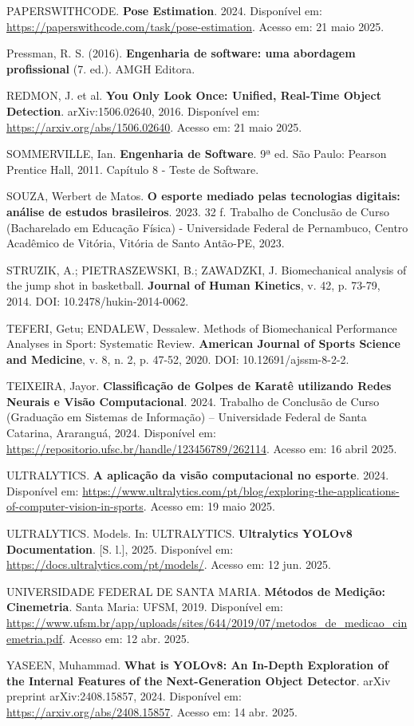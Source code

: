 \begin{flushleft}
PAPERSWITHCODE. \textbf{Pose Estimation}. 2024. Disponível em: \url{https://paperswithcode.com/task/pose-estimation}. Acesso em: 21 maio 2025.

Pressman, R. S. (2016). \textbf{Engenharia de software: uma abordagem profissional} (7. ed.). AMGH Editora.

REDMON, J. et al. \textbf{You Only Look Once: Unified, Real-Time Object Detection}. arXiv:1506.02640, 2016. Disponível em: \url{https://arxiv.org/abs/1506.02640}. Acesso em: 21 maio 2025.

SOMMERVILLE, Ian. \textbf{Engenharia de Software}. 9ª ed. São Paulo: Pearson Prentice Hall, 2011. Capítulo 8 - Teste de Software.

SOUZA, Werbert de Matos. \textbf{O esporte mediado pelas tecnologias digitais: análise de estudos brasileiros}. 2023. 32 f. Trabalho de Conclusão de Curso (Bacharelado em Educação Física) - Universidade Federal de Pernambuco, Centro Acadêmico de Vitória, Vitória de Santo Antão-PE, 2023.

STRUZIK, A.; PIETRASZEWSKI, B.; ZAWADZKI, J. Biomechanical analysis of the jump shot in basketball. \textbf{Journal of Human Kinetics}, v. 42, p. 73-79, 2014. DOI: 10.2478/hukin-2014-0062.

TEFERI, Getu; ENDALEW, Dessalew. Methods of Biomechanical Performance Analyses in Sport: Systematic Review. \textbf{American Journal of Sports Science and Medicine}, v. 8, n. 2, p. 47-52, 2020. DOI: 10.12691/ajssm-8-2-2.

TEIXEIRA, Jayor. \textbf{Classificação de Golpes de Karatê utilizando Redes Neurais e Visão Computacional}. 2024. Trabalho de Conclusão de Curso (Graduação em Sistemas de Informação) – Universidade Federal de Santa Catarina, Araranguá, 2024. Disponível em: \url{https://repositorio.ufsc.br/handle/123456789/262114}. Acesso em: 16 abril 2025.

ULTRALYTICS. \textbf{A aplicação da visão computacional no esporte}. 2024. Disponível em: \url{https://www.ultralytics.com/pt/blog/exploring-the-applications-of-computer-vision-in-sports}. Acesso em: 19 maio 2025.

ULTRALYTICS. Models. In: ULTRALYTICS. \textbf{Ultralytics YOLOv8 Documentation}. [S. l.], 2025. Disponível em: \url{https://docs.ultralytics.com/pt/models/}. Acesso em: 12 jun. 2025.

UNIVERSIDADE FEDERAL DE SANTA MARIA. \textbf{Métodos de Medição: Cinemetria}. Santa Maria: UFSM, 2019. Disponível em: \url{https://www.ufsm.br/app/uploads/sites/644/2019/07/metodos_de_medicao_cinemetria.pdf}. Acesso em: 12 abr. 2025.

YASEEN, Muhammad. \textbf{What is YOLOv8: An In-Depth Exploration of the Internal Features of the Next-Generation Object Detector}. arXiv preprint arXiv:2408.15857, 2024. Disponível em: \url{https://arxiv.org/abs/2408.15857}. Acesso em: 14 abr. 2025.

\end{flushleft}
